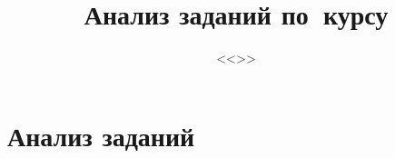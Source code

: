 \documentclass[12pt]{report}
\title{Анализ заданий по~курсу}
\subtitle{<<\coursetitle>>}
\begin{document}
\maketitle
\tableofcontents




\chapter{Анализ заданий}


\parindent=0pt

\end{document}
